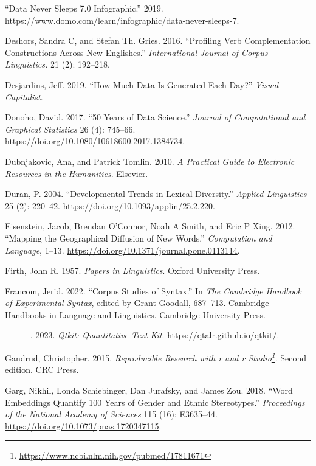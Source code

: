 \documentclass[
  letterpaper,
]{latex/krantz}
\newlength{\cslhangindent}
\newenvironment{CSLReferences}[2] %
 {\begin{list}{}{%
  \setlength{\itemindent}{0pt}
  \setlength{\leftmargin}{0pt}
  \setlength{\parsep}{0pt}
  \ifodd #1
   \setlength{\leftmargin}{\cslhangindent}
   \setlength{\itemindent}{-1\cslhangindent}
  \fi
  \setlength{\itemsep}{#2\baselineskip}}}
 {\end{list}}
\theoremstyle{definition}
\theoremstyle{remark}
\DeclareRobustCommand{\href}[2]{#2\footnote{\url{#1}}}
\begin{document}
\begin{CSLReferences}{1}{0}
{``Data Never Sleeps 7.0 Infographic.''} 2019.
https://www.domo.com/learn/infographic/data-never-sleeps-7.

Deshors, Sandra C, and Stefan Th. Gries. 2016. {``Profiling Verb
Complementation Constructions Across New Englishes.''}
\emph{International Journal of Corpus Linguistics.} 21 (2): 192--218.

Desjardins, Jeff. 2019. {``How Much Data Is Generated Each Day?''}
\emph{Visual Capitalist}.

Donoho, David. 2017. {``50 Years of Data Science.''} \emph{Journal of
Computational and Graphical Statistics} 26 (4): 745--66.
\url{https://doi.org/10.1080/10618600.2017.1384734}.

Dubnjakovic, Ana, and Patrick Tomlin. 2010. \emph{A Practical Guide to
Electronic Resources in the Humanities}. Elsevier.

Duran, P. 2004. {``Developmental Trends in Lexical Diversity.''}
\emph{Applied Linguistics} 25 (2): 220--42.
\url{https://doi.org/10.1093/applin/25.2.220}.

Eisenstein, Jacob, Brendan O'Connor, Noah A Smith, and Eric P Xing.
2012. {``Mapping the Geographical Diffusion of New Words.''}
\emph{Computation and Language}, 1--13.
\url{https://doi.org/10.1371/journal.pone.0113114}.

Firth, John R. 1957. \emph{Papers in Linguistics}. Oxford University
Press.

Francom, Jerid. 2022. {``Corpus Studies of Syntax.''} In \emph{The
Cambridge Handbook of Experimental Syntax}, edited by Grant Goodall,
687--713. Cambridge Handbooks in Language and Linguistics. Cambridge
University Press.

---------. 2023. \emph{Qtkit: Quantitative Text Kit}.
\url{https://qtalr.github.io/qtkit/}.

Gandrud, Christopher. 2015.
\emph{\href{https://www.ncbi.nlm.nih.gov/pubmed/17811671}{Reproducible
Research with r and r Studio}}. Second edition. CRC Press.

Garg, Nikhil, Londa Schiebinger, Dan Jurafsky, and James Zou. 2018.
{``Word Embeddings Quantify 100 Years of Gender and Ethnic
Stereotypes.''} \emph{Proceedings of the National Academy of Sciences}
115 (16): E3635--44. \url{https://doi.org/10.1073/pnas.1720347115}.


\end{CSLReferences}
\end{document}
